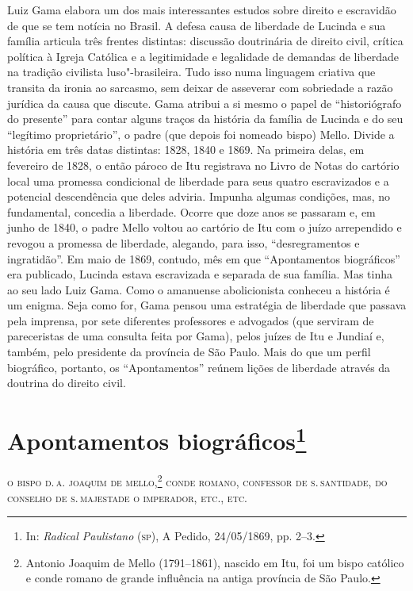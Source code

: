 {\small\noindent
Luiz Gama elabora um dos mais interessantes estudos sobre direito
e escravidão de que se tem notícia no Brasil. A defesa causa de
liberdade de Lucinda e sua família articula três frentes distintas:
discussão doutrinária de direito civil, crítica política à Igreja
Católica e a legitimidade e legalidade de demandas de liberdade na
tradição civilista luso"-brasileira. Tudo isso numa
linguagem criativa que transita da ironia ao sarcasmo, sem deixar de
asseverar com sobriedade a razão jurídica da causa que discute. Gama
atribui a si mesmo o papel de ``historiógrafo do presente'' para contar
alguns traços da história da família de Lucinda e do seu ``legítimo
proprietário'', o padre (que depois foi nomeado bispo) Mello. Divide a
história em três datas distintas: 1828, 1840 e 1869. Na primeira delas,
em fevereiro de 1828, o então pároco de Itu registrava no Livro de Notas
do cartório local uma promessa condicional de liberdade para seus quatro
escravizados e a potencial descendência que deles adviria. Impunha
algumas condições, mas, no fundamental, concedia a liberdade. Ocorre que
doze anos se passaram e, em junho de 1840, o padre Mello voltou ao
cartório de Itu com o juízo arrependido e revogou a promessa de
liberdade, alegando, para isso, ``desregramentos e ingratidão''. Em maio
de 1869, contudo, mês em que ``Apontamentos biográficos'' era publicado,
Lucinda estava escravizada e separada de sua família. Mas tinha ao seu
lado Luiz Gama. Como o amanuense abolicionista conheceu a história é um
enigma. Seja como for, Gama pensou uma estratégia de liberdade que
passava pela imprensa, por sete diferentes professores e advogados (que
serviram de pareceristas de uma consulta feita por Gama), pelos juízes
de Itu e Jundiaí e, também, pelo presidente da província de São Paulo.
Mais do que um perfil biográfico, portanto, os ``Apontamentos'' reúnem
lições de liberdade através da doutrina do direito civil. }

\chapter{Apontamentos biográficos\footnote[*]{In: \emph{Radical
  Paulistano} (\textsc{sp}), A Pedido, 24/05/1869, pp. 2--3.}}


\textsc{o bispo d.\,a. joaquim de mello},\footnote{Antonio Joaquim de Mello
  (1791--1861), nascido em Itu, foi um bispo católico e conde romano de
  grande influência na antiga província de São Paulo.} \textsc{conde romano,
  confessor de s.\,santidade, do conselho de s.\,majestade o imperador,
  etc., etc.}

